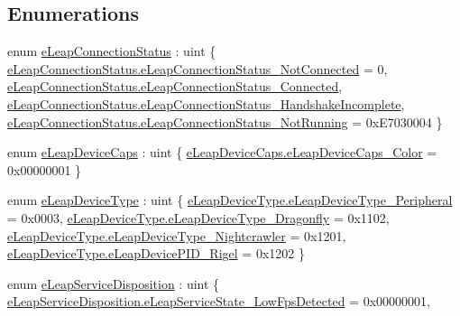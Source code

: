 \subsection*{Enumerations}
\begin{DoxyCompactItemize}
\item 
enum \mbox{\hyperlink{namespace_leap_internal_a98a6a4220fcab393d11bf4ec2eecdea6}{e\+Leap\+Connection\+Status}} \+: uint \{ \mbox{\hyperlink{namespace_leap_internal_a98a6a4220fcab393d11bf4ec2eecdea6a32ba30a7697edcdf70b10eec1cfdaef5}{e\+Leap\+Connection\+Status.\+e\+Leap\+Connection\+Status\+\_\+\+Not\+Connected}} = 0, 
\mbox{\hyperlink{namespace_leap_internal_a98a6a4220fcab393d11bf4ec2eecdea6a5543a27b2d45ff8095aa63035787d07e}{e\+Leap\+Connection\+Status.\+e\+Leap\+Connection\+Status\+\_\+\+Connected}}, 
\mbox{\hyperlink{namespace_leap_internal_a98a6a4220fcab393d11bf4ec2eecdea6a3120e949e31e69ed284387f99cfd7069}{e\+Leap\+Connection\+Status.\+e\+Leap\+Connection\+Status\+\_\+\+Handshake\+Incomplete}}, 
\mbox{\hyperlink{namespace_leap_internal_a98a6a4220fcab393d11bf4ec2eecdea6a951d2f066bd120bc5ad9335e15d94362}{e\+Leap\+Connection\+Status.\+e\+Leap\+Connection\+Status\+\_\+\+Not\+Running}} = 0x\+E7030004
 \}
\item 
enum \mbox{\hyperlink{namespace_leap_internal_abaf362ab57323da251a6eb1444092a4b}{e\+Leap\+Device\+Caps}} \+: uint \{ \mbox{\hyperlink{namespace_leap_internal_abaf362ab57323da251a6eb1444092a4ba13503efceadfd067a6ca2696d01cae9b}{e\+Leap\+Device\+Caps.\+e\+Leap\+Device\+Caps\+\_\+\+Color}} = 0x00000001
 \}
\item 
enum \mbox{\hyperlink{namespace_leap_internal_a2f134f9672b8f6ded5ec9979abc7fe91}{e\+Leap\+Device\+Type}} \+: uint \{ \mbox{\hyperlink{namespace_leap_internal_a2f134f9672b8f6ded5ec9979abc7fe91a77303ee092f28b4fb0776ea505aa3f7c}{e\+Leap\+Device\+Type.\+e\+Leap\+Device\+Type\+\_\+\+Peripheral}} = 0x0003, 
\mbox{\hyperlink{namespace_leap_internal_a2f134f9672b8f6ded5ec9979abc7fe91a3aed7fee7a4b0d194efd1331daeb6779}{e\+Leap\+Device\+Type.\+e\+Leap\+Device\+Type\+\_\+\+Dragonfly}} = 0x1102, 
\mbox{\hyperlink{namespace_leap_internal_a2f134f9672b8f6ded5ec9979abc7fe91a4d5afdd56da7e1a4e52d757d2e132beb}{e\+Leap\+Device\+Type.\+e\+Leap\+Device\+Type\+\_\+\+Nightcrawler}} = 0x1201, 
\mbox{\hyperlink{namespace_leap_internal_a2f134f9672b8f6ded5ec9979abc7fe91a3fc91fa5ff9bef40228898ddf49c61f2}{e\+Leap\+Device\+Type.\+e\+Leap\+Device\+P\+I\+D\+\_\+\+Rigel}} = 0x1202
 \}
\item 
enum \mbox{\hyperlink{namespace_leap_internal_ab2f23b85c583724a090dca2c20793d85}{e\+Leap\+Service\+Disposition}} \+: uint \{ \mbox{\hyperlink{namespace_leap_internal_ab2f23b85c583724a090dca2c20793d85ae17aaee6cb4325d762d64eb873a2fd45}{e\+Leap\+Service\+Disposition.\+e\+Leap\+Service\+State\+\_\+\+Low\+Fps\+Detected}} = 0x00000001, 

\end{DoxyCompactItemize}
